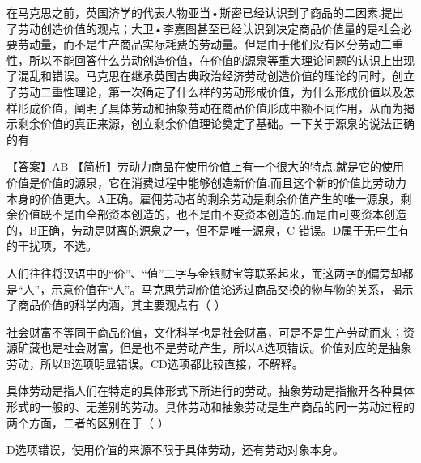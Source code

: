 \question 在马克思之前，英国济学的代表人物亚当•斯密已经认识到了商品的二因素.提出了劳动创造价值的观点；大卫•李嘉图甚至已经认识到决定商品价值量的是社会必要劳动量，而不是生产商品实际耗费的劳动量。但是由于他们没有区分劳动二重性，所以不能回答什么劳动创造价值，在价值的源泉等重大理论问题的认识上出现了混乱和错误。马克思在继承英国古典政治经济劳动创造价值的理论的同时，创立了劳动二重性理论，第一次确定了什么样的劳动形成价值，为什么形成价值以及怎样形成价值，阐明了具体劳动和抽象劳动在商品价值形成中额不同作用，从而为揭示剩余价值的真正来源，创立剩余价值理论奠定了基础。一下关于源泉的说法正确的有
\par{}
\begin{solution}【答案】AB
【简析】劳动力商品在使用价值上有一个很大的特点.就是它的使用价值是价值的源泉，它在消费过程中能够创造新价值.而且这个新的价值比劳动力本身的价值更大。A正确。雇佣劳动者的剩余劳动是剩余价值产生的唯一源泉，剩余价值既不是由全部资本创造的，也不是由不变资本创造的.而是由可变资本创造的，B正确，劳动是财离的源泉之一，但不是唯一源泉，C
错误。D属于无中生有的干扰项，不选。
\end{solution}
\question 人们往往将汉语中的``价''、``值''二字与金银财宝等联系起来，而这两字的偏旁却都是``人''，示意价值在``人''。马克思劳动价值论透过商品交换的物与物的关系，揭示了商品价值的科学内涵，其主要观点有（
）
\par{}
\begin{solution}社会财富不等同于商品价值，文化科学也是社会财富，可是不是生产劳动而来；资源矿藏也是社会财富，但是也不是劳动产生，所以A选项错误。价值对应的是抽象劳动，所以B选项明显错误。CD选项都比较直接，不解释。
\end{solution}
\question 具体劳动是指人们在特定的具体形式下所进行的劳动。抽象劳动是指撇开各种具体形式的一般的、无差别的劳动。具体劳动和抽象劳动是生产商品的同一劳动过程的两个方面，二者的区别在于（
）
\par{}
\begin{solution}D选项错误，使用价值的来源不限于具体劳动，还有劳动对象本身。
\end{solution}
